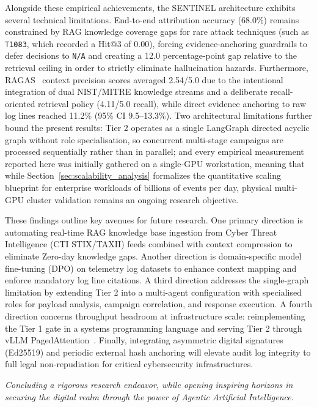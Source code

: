 Alongside these empirical achievements, the SENTINEL architecture exhibits several technical limitations. End-to-end attribution accuracy (68.0\%) remains constrained by RAG knowledge coverage gaps for rare attack techniques (such as \texttt{T1083}, which recorded a Hit@3 of 0.00), forcing evidence-anchoring guardrails to defer decisions to \texttt{N/A} and creating a 12.0 percentage-point gap relative to the retrieval ceiling in order to strictly eliminate hallucination hazards. Furthermore, RAGAS~\cite{ragas2023} context precision scores averaged 2.54/5.0 due to the intentional integration of dual NIST/MITRE knowledge streams and a deliberate recall-oriented retrieval policy (4.11/5.0 recall), while direct evidence anchoring to raw log lines reached 11.2\% (95\% CI 9.5--13.3\%). Two architectural limitations further bound the present results: Tier 2 operates as a single LangGraph directed acyclic graph without role specialisation, so concurrent multi-stage campaigns are processed sequentially rather than in parallel; and every empirical measurement reported here was initially gathered on a single-GPU workstation, meaning that while Section~\ref{sec:scalability_analysis} formalizes the quantitative scaling blueprint for enterprise workloads of billions of events per day, physical multi-GPU cluster validation remains an ongoing research objective.

These findings outline key avenues for future research. One primary direction is automating real-time RAG knowledge base ingestion from Cyber Threat Intelligence (CTI STIX/TAXII) feeds combined with context compression to eliminate Zero-day knowledge gaps. Another direction is domain-specific model fine-tuning (DPO) on telemetry log datasets to enhance context mapping and enforce mandatory log line citations. A third direction addresses the single-graph limitation by extending Tier 2 into a multi-agent configuration with specialised roles for payload analysis, campaign correlation, and response execution. A fourth direction concerns throughput headroom at infrastructure scale: reimplementing the Tier 1 gate in a systems programming language and serving Tier 2 through vLLM PagedAttention~\cite{kwon2023vllm}. Finally, integrating asymmetric digital signatures (Ed25519) and periodic external hash anchoring will elevate audit log integrity to full legal non-repudiation for critical cybersecurity infrastructures.

\vspace{0.3cm}
\begin{flushright}
    \textit{Concluding a rigorous research endeavor, while opening inspiring horizons in securing the digital realm through the power of Agentic Artificial Intelligence.}
\end{flushright}
